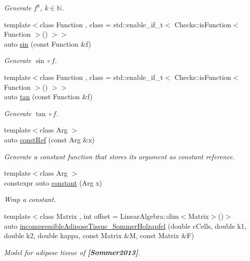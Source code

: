 \begin{DoxyCompactItemize}
\begin{DoxyCompactList}\small\item\em Generate $ f^k,\ k\in\mathbb{N}$. \end{DoxyCompactList}\item 
{\footnotesize template$<$class Function , class  = std\+::enable\+\_\+if\+\_\+t$<$ Checks\+::is\+Function$<$ Function $>$() $>$$>$ }\\auto \hyperlink{group__CMathGroup_ga663fdbe7a8977cba529c7c33981b7738}{sin} (const Function \&f)
\begin{DoxyCompactList}\small\item\em Generate $ \sin\circ f $. \end{DoxyCompactList}\item 
{\footnotesize template$<$class Function , class  = std\+::enable\+\_\+if\+\_\+t$<$ Checks\+::is\+Function$<$ Function $>$() $>$$>$ }\\auto \hyperlink{group__CMathGroup_gae03f57bd4efb4449ad1dc60cb74c742d}{tan} (const Function \&f)
\begin{DoxyCompactList}\small\item\em Generate $ \tan\circ f $. \end{DoxyCompactList}\item 
{\footnotesize template$<$class Arg $>$ }\\auto \hyperlink{namespaceFunG_abcfb38c2e995436816ea884803302f2d}{const\+Ref} (const Arg \&x)
\begin{DoxyCompactList}\small\item\em Generate a constant function that stores its argument as constant reference. \end{DoxyCompactList}\item 
{\footnotesize template$<$class Arg $>$ }\\constexpr auto \hyperlink{namespaceFunG_a939d13d36c194b402715f12a28147cdc}{constant} (Arg x)
\begin{DoxyCompactList}\small\item\em Wrap a constant. \end{DoxyCompactList}\item 
{\footnotesize template$<$class Matrix , int offset = Linear\+Algebra\+::dim$<$\+Matrix$>$()$>$ }\\auto \hyperlink{group__Biomechanics_gac269eefc1abb994044e1634c20a98061}{incompressible\+Adipose\+Tissue\+\_\+\+Sommer\+Holzapfel} (double c\+Cells, double k1, double k2, double kappa, const Matrix \&M, const Matrix \&F)
\begin{DoxyCompactList}\small\item\em Model for adipose tissue of {\bfseries [Sommer2013]}. \end{DoxyCompactList}\item 

\end{DoxyCompactItemize}
